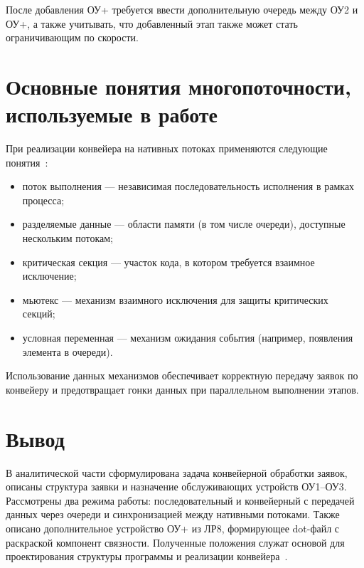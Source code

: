 После добавления ОУ+ требуется ввести дополнительную очередь между ОУ2 и ОУ+, а также учитывать, что добавленный этап также может стать ограничивающим по скорости.

\section{Основные понятия многопоточности, используемые в работе}

При реализации конвейера на нативных потоках применяются следующие понятия~\cite{cpp_standard}:
\begin{itemize}
	\item поток выполнения --- независимая последовательность исполнения в рамках процесса;
	\item разделяемые данные --- области памяти (в том числе очереди), доступные нескольким потокам;
	\item критическая секция --- участок кода, в котором требуется взаимное исключение;
	\item мьютекс --- механизм взаимного исключения для защиты критических секций;
	\item условная переменная --- механизм ожидания события (например, появления элемента в очереди).
\end{itemize}

Использование данных механизмов обеспечивает корректную передачу заявок по конвейеру и предотвращает гонки данных при параллельном выполнении этапов.

\section*{Вывод}

В аналитической части сформулирована задача конвейерной обработки заявок, описаны структура заявки и назначение обслуживающих устройств ОУ1--ОУ3.
Рассмотрены два режима работы: последовательный и конвейерный с передачей данных через очереди и синхронизацией между нативными потоками.
Также описано дополнительное устройство ОУ+ из ЛР8, формирующее dot-файл с раскраской компонент связности.
Полученные положения служат основой для проектирования структуры программы и реализации конвейера~\cite{valedinsky2018,cpp_standard}.
